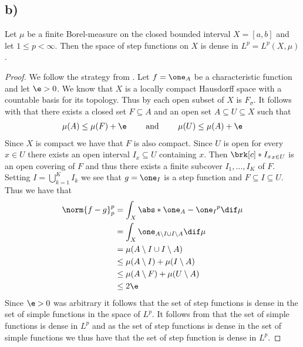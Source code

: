 \subsection{b)}
\begin{claim}
Let $\mu$ be a finite Borel-measure on the closed bounded interval $X=[a,b]$ and let $1\leq p<\infty$. Then the space of step functions on $X$ is dense in $L^p=L^p(X,\mu)$.
\end{claim}

\begin{proof}
We follow the strategy from \cite[Proposition 3.4.3]{CohnMT}. Let $f=\one_A$ be a characteristic function and let $\e>0$.
We know that $X$ is a locally compact Hausdorff space with a countable basis for its topology. Thus by \cite[Proposition 7.1.5]{CohnMT} each open subset of $X$ is $F_\sigma$. It follows with \cite[Lemma 7.2.4]{CohnMT} that there exists a closed set $F\subseteq A$ and an open set $A\subseteq U\subseteq X$ such that
\begin{align*}
	\mu(A)\leq \mu(F)+\e \qquad\text{ and }\qquad
	\mu(U)\leq \mu(A)+\e
\end{align*}
Since $X$ is compact we have that $F$ is also compact. Since $U$ is open for every $x\in U$ there exists an open interval $I_x\subseteq U$ containing $x$. Then $\brk[c]*{I_x}_{x\in U}$ is an open covering of $F$ and thus there exists a finite subcover $I_1,\dots,I_K$ of $F$. Setting $I=\bigcup_{k=1}^KI_k$ we see that $g=\one_{I}$ is a step function and $F\subseteq I\subseteq U$. Thus we have that
\begin{align*}
	\norm{f-g}_{p}^p
	&= \int_X\abs*{\one_A-\one_I}^p\dif \mu \\
	&= \int_X\one_{A\setminus I\cup I\setminus A}\dif \mu \\
	&= \mu(A\setminus I\cup I\setminus A) \\
	&\leq \mu(A\setminus I)+\mu(I\setminus A) \\
	&\leq \mu(A\setminus F)+\mu(U\setminus A) \\
	&\leq 2\e
\end{align*}
Since $\e>0$ was arbitrary it follows that the set of step functions is dense in the set of simple functions in the space of $L^p$. It follows from \cite[Proposition 3.4.2]{CohnMT} that the set of simple functions is dense in $L^p$ and as the set of step functions is dense in the set of simple functions we thus have that the set of step function is dense in $L^p$.
\end{proof}


